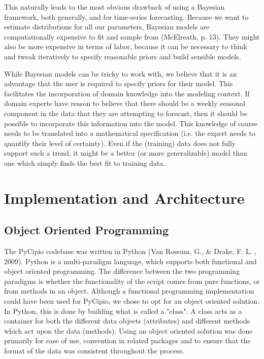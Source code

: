 \documentclass{article}
\begin{document}
This naturally leads to the most obvious drawback of using a Bayesian framework, both generally, and for time-series forecasting. Because we want to estimate distributions for all our parameters, Bayesian models are computationally expensive to fit and sample from (McElreath, p. 13). They might also be more expensive in terms of labor, because it can be necessary to think and tweak iteratively to specify reasonable priors and build sensible models.

While Bayesian models can be tricky to work with, we believe that it is an advantage that the user is required to specify priors for their model. This facilitates the incorporation of domain knowledge into the modeling context. If domain experts have reason to believe that there should be a weekly seasonal component in the data that they are attempting to forecast, then it should be possible to incorporate this information into the model. This knowledge of course needs to be translated into a mathematical specification (i.e. the expert needs to quantify their level of certainty). Even if the (training) data does not fully support such a trend, it might be a better (or more generalizable) model than one which simply finds the best fit to training data. 

\section{Implementation and Architecture}

\subsection{Object Oriented Programming}

The PyCipio codebase was written in Python (Van Rossum, G., \& Drake, F. L. , 2009). Python is a multi-paradigm language, which supports both functional and object oriented programming. The difference between the two programming paradigms is whether the functionality of the script comes from pure functions, or from methods in an object. Although a functional programming implementation could have been used for PyCipio, we chose to opt for an object oriented solution. In Python, this is done by building what is called a "class". A class acts as a container for both the different data objects (attributes) and different methods which act upon the data (methods). Using an object oriented solution was done primarily for ease of use, convention in related packages and to ensure that the format of the data was consistent throughout the process.
\end{document}
